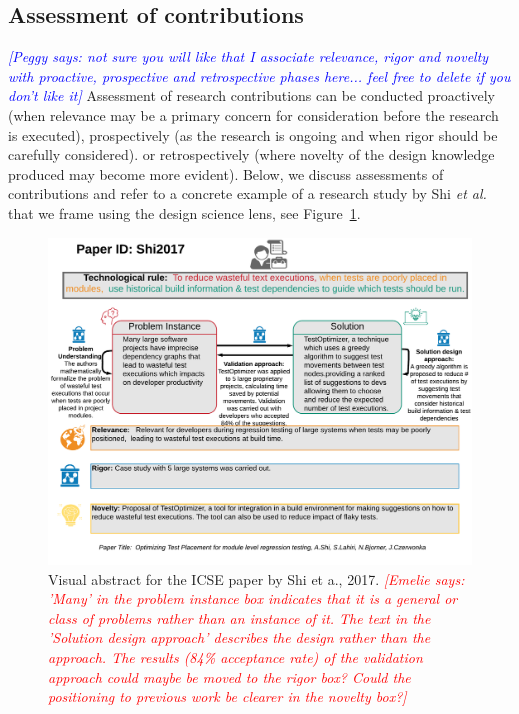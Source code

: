 \documentclass[graybox]{svmult}
\newcommand{\emelie}[1]{\textcolor{red}{{\it [Emelie says: #1]}}}
\newcommand{\peggy}[1]{\textcolor{blue}{{\it [Peggy says: #1]}}}
\newcommand{\emelie}[1]{}
\newcommand{\peggy}[1]{}
\begin{document}
{\subsection{Assessment of contributions}
\label{sec:assessment}

\peggy{not sure you will like that I associate relevance, rigor and novelty with proactive, prospective and retrospective phases here... feel free to delete if you don't like it}
Assessment of research contributions can be conducted proactively (when relevance may be a primary concern for consideration before the research is executed), prospectively (as the research is ongoing and when rigor should be carefully considered). or retrospectively (where novelty of the design knowledge produced may become more evident).
Below, we discuss assessments of contributions and refer to a concrete example of a research study by Shi \emph{et al.}~\cite{Shi2017} that we frame using the design science lens, see Figure~\ref{fig:VA-example}. 


\begin{figure}
  \includegraphics[width=1.0\textwidth]{Figures/Shi2017.png}
\caption{Visual abstract for the ICSE paper by Shi et a., 2017. \emelie{'Many' in the problem instance box indicates that it is a general or class of problems rather than an instance of it. The text in the 'Solution design approach' describes the design rather than the approach. The results (84\% acceptance rate) of the validation approach could maybe be moved to the rigor box? Could the positioning to previous work be clearer in the novelty box?}}
\label{fig:VA-example}       %
\end{figure}


}
\end{document}
